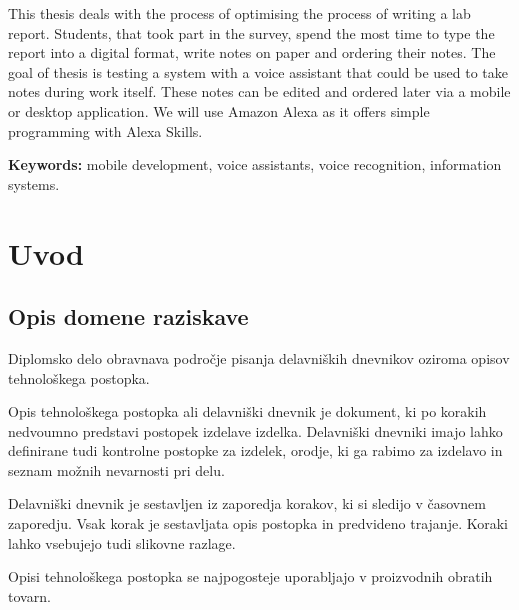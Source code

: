 \documentclass[a4paper, 12pt]{book}
\newcommand{\tkeywordsEn}{mobile development, voice assistants, voice recognition, information systems}
\newcommand{\clearemptydoublepage}{\newpage{\pagestyle{empty}\cleardoublepage}}
\begin{document}
\noindent This thesis deals with the process of optimising the process of writing a lab report.
Students, that took part in the survey, spend the most time to type the report into a digital format, write notes on paper and ordering their notes.
The goal of thesis is testing a system with a voice assistant that could be used to take notes during work itself.
These notes can be edited and ordered later via a mobile or desktop application.
We will use Amazon Alexa as it offers simple programming with Alexa Skills.
\bigskip

\noindent\textbf{Keywords:} \tkeywordsEn.
\clearemptydoublepage

\mainmatter
\setcounter{page}{1}
\pagestyle{fancy}

\chapter{Uvod}
\section{Opis domene raziskave}

Diplomsko delo obravnava področje pisanja delavniških dnevnikov oziroma opisov tehnološkega postopka.

Opis tehnološkega postopka ali delavniški dnevnik je dokument, ki po korakih nedvoumno predstavi postopek izdelave izdelka.
Delavniški dnevniki imajo lahko definirane tudi kontrolne postopke za izdelek, orodje, ki ga rabimo za izdelavo in seznam možnih nevarnosti pri delu.

Delavniški dnevnik je sestavljen iz zaporedja korakov, ki si sledijo v časovnem zaporedju.
Vsak korak je sestavljata opis postopka in predvideno trajanje.
Koraki lahko vsebujejo tudi slikovne razlage.

Opisi tehnološkega postopka se najpogosteje uporabljajo v proizvodnih obratih tovarn.
\end{document}
